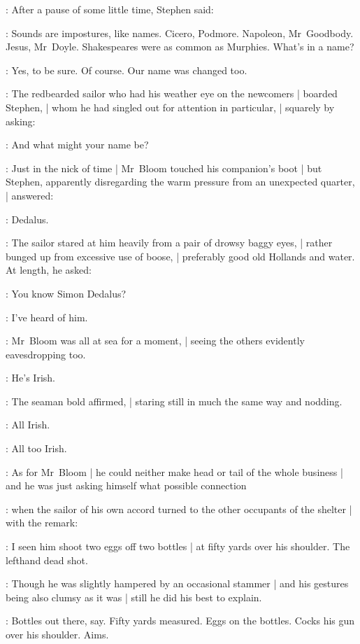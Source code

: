:
After a pause of some little time, Stephen said:

\Stephen:
Sounds are impostures, like names.
Cicero, Podmore. Napoleon, Mr~Goodbody. Jesus, Mr~Doyle.
Shakespeares were as common as Murphies.
What's in a name?

\Bloom:
Yes, to be sure.
Of course.
Our name was changed too.

:
The redbearded sailor who had his weather eye on the newcomers |
boarded Stephen, |
whom he had singled out for attention in particular, |
squarely by asking:

\Murphy:
And what might your name be?

:
Just in the nick of time |
Mr~Bloom touched his companion's boot |
but Stephen, apparently disregarding the warm pressure from an unexpected quarter, |
answered:

\Stephen:
Dedalus.

:
The sailor stared at him heavily from a pair of drowsy baggy eyes, |
rather bunged up from excessive use of boose, |
preferably good old Hollands and water.
At length, he asked:

\Murphy:
You know Simon Dedalus?

\Stephen:
I've heard of him.

:
Mr~Bloom was all at sea for a moment, |
seeing the others evidently eavesdropping too.

\Murphy:
He's Irish.

:
The seaman bold affirmed, |
staring still in much the same way and nodding.

\Murphy:
All Irish.

\Stephen:
All too Irish.

:
As for Mr~Bloom |
he could neither make head or tail of the whole business |
and he was just asking himself what possible connection

:
when the sailor of his own accord
turned to the other occupants of the shelter |
with the remark:

\Murphy:
I seen him shoot two eggs off two bottles |
at fifty yards over his shoulder.
The lefthand dead shot.

:
Though he was slightly hampered by an occasional stammer |
and his gestures being also clumsy as it was |
still he did his best to explain.

\Murphy:
Bottles out there, say.
Fifty yards measured.
Eggs on the bottles.
Cocks his gun over his shoulder.
Aims.

